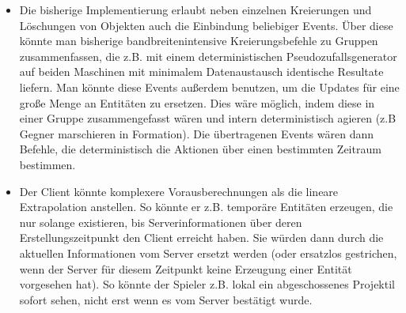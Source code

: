 \begin{itemize}
\item Die bisherige Implementierung erlaubt neben einzelnen Kreierungen und Löschungen von Objekten auch die Einbindung beliebiger Events. Über diese könnte man bisherige bandbreitenintensive Kreierungsbefehle zu Gruppen zusammenfassen, die z.B. mit einem deterministischen Pseudozufallsgenerator auf beiden Maschinen mit minimalem Datenaustausch identische Resultate liefern. Man könnte diese Events außerdem benutzen, um die Updates für eine große Menge an Entitäten zu ersetzen. Dies wäre möglich, indem diese in einer Gruppe zusammengefasst wären und intern deterministisch agieren (z.B Gegner marschieren in Formation). Die übertragenen Events wären dann Befehle, die deterministisch die Aktionen über einen bestimmten Zeitraum bestimmen.
\item Der Client könnte komplexere Vorausberechnungen als die lineare Extrapolation anstellen. So könnte er z.B. temporäre Entitäten erzeugen, die nur solange existieren, bis Serverinformationen über deren Erstellungszeitpunkt den Client erreicht haben. Sie würden dann durch die aktuellen Informationen vom Server ersetzt werden (oder ersatzlos gestrichen, wenn der Server für diesem Zeitpunkt keine Erzeugung einer Entität vorgesehen hat). So könnte der Spieler z.B. lokal ein abgeschossenes Projektil sofort sehen, nicht erst wenn es vom Server bestätigt wurde.
\end{itemize}

